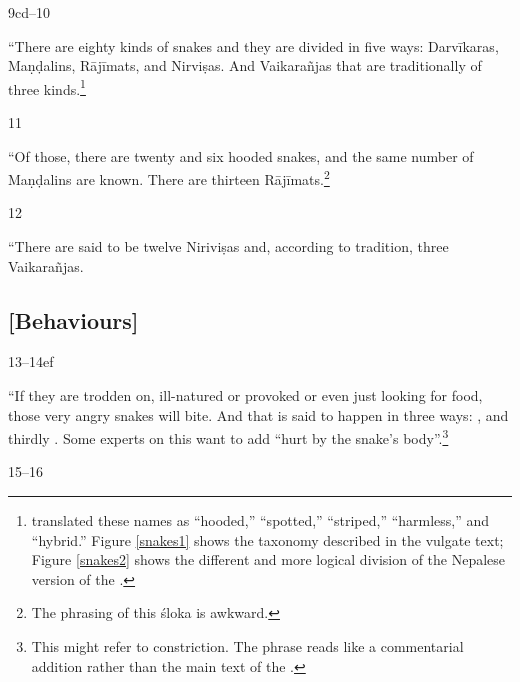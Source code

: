     \begin{translation}
        \item[9cd--10]    
        
        “There are eighty kinds of snakes and they are divided in five ways:
        Darvīkaras, Maṇḍalins, Rājīmats, and Nirviṣas.  And Vaikarañjas that are
        traditionally of three kinds.\footnote{\citet{hari-2011} translated these
            names as “hooded,” “spotted,” “striped,” “harmless,” and “hybrid.” Figure 
            \ref{snakes1} shows the taxonomy described in the vulgate text; Figure 
            \ref{snakes2} shows the different and more logical division of the Nepalese 
            version of the \SS.}
            
    \item [11] 
    
    “Of those, there are twenty and six hooded snakes, and the same number
of Maṇḍalins are known.  There are thirteen Rājīmats.\footnote{The phrasing of
    this śloka is awkward.}
    
    \item [12]
    
    “There are said to be twelve Niriviṣas and, according to tradition, three 
    Vaikarañjas.
    
    
\subsection{[Behaviours]}    

    \item [13--14ef]
    
“If they are trodden on, ill-natured or provoked or even just looking for
food, those very angry snakes will bite.  And that is said to happen in
three ways: ,  and thirdly
.  Some experts on this want to add “hurt by the
snake's body”.\footnote{This might refer to constriction.  The phrase reads
    like a commentarial addition rather than the main text of the \SS.}

\item[15--16]


\end{translation}
